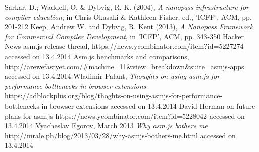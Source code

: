 \documentclass[11pt]{report}
\begin{document}
\begin{thebibliography}{1}
     Sarkar, D.; Waddell, O. \& Dybvig, R. K. (2004), {\em A nanopass infrastructure for compiler education}, in Chris Okasaki \& Kathleen Fisher, ed., 'ICFP', ACM, pp. 201-212
     Keep, Andrew W. and Dybvig, R. Kent (2013), {\em A Nanopass Framework for Commercial Compiler Development}, in 'ICFP', ACM, pp. 343-350
     Hacker News asm.js release thread, https://news.ycombinator.com/item?id=5227274 accessed on 13.4.2014
     Asm.js benchmarks and comparisons, http://arewefastyet.com/\#machine=11\&view=breakdown\&suite=asmjs-apps accessed on 13.4.2014
     Wladimir Palant, {\em Thoughts on using asm.js for performance bottlenecks in browser extensions} https://adblockplus.org/blog/thoghts-on-using-asmjs-for-performance-bottlenecks-in-browser-extensions accessed on 13.4.2014
     David Herman on future plans for asm.js https://news.ycombinator.com/item?id=5228042 accessed on 13.4.2014
     Vyacheslav Egorov, March 2013 {\em Why asm.js bothers me} http://mrale.ph/blog/2013/03/28/why-asmjs-bothers-me.html accessed on 13.4.2014
\end{thebibliography}
\end{document}
